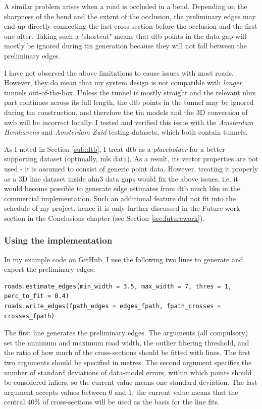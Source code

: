 A similar problem arises when a road is occluded in a bend. Depending on the sharpness of the bend and the extent of the occlusion, the preliminary edges may end up directly connecting the last cross-section before the occlusion and the first one after. Taking such a "shortcut" means that \ac{dtb} points in the data gap will mostly be ignored during \ac{tin} generation because they will not fall between the preliminary edges.

I have not observed the above limitations to cause issues with most roads. However, they do mean that my system design is not compatible with \textit{longer} tunnels out-of-the-box. Unless the tunnel is mostly straight and the relevant \ac{nbrs} part continues across its full length, the \ac{dtb} points in the tunnel may be ignored during \ac{tin} construction, and therefore the \ac{tin} models and the 3D conversion of \ac{nwb} will be incorrect locally. I tested and verified this issue with the \textit{Amsterdam Hemhavens} and \textit{Amsterdam Zuid} testing datasets, which both contain tunnels.

As I noted in Section \ref{sub:dtb}, I treat \ac{dtb} as a \textit{placeholder} for a better supporting dataset (optimally, \ac{mls} data). As a result, its vector properties are not used - it is assumed to consist of generic point data. However, treating it properly as a 3D line dataset inside \ac{ahn3} data gaps would fix the above issues, i.e. it would become possible to generate edge estimates from \ac{dtb} much like in the commercial implementation. Such an additional feature did not fit into the schedule of my project, hence it is only further discussed in the Future work section in the Conclusions chapter (see Section \ref{sec:futurework}).

\subsubsection{Using the implementation}

In my example code on GitHub, I use the following two lines to generate and export the preliminary edges:

\begin{verbatim}
roads.estimate_edges(min_width = 3.5, max_width = 7, thres = 1, perc_to_fit = 0.4)
roads.write_edges(fpath_edges = edges_fpath, fpath_crosses = crosses_fpath)
\end{verbatim}

The first line generates the preliminary edges. The arguments (all compulsory) set the minimum and maximum road width, the outlier filtering threshold, and the ratio of how much of the cross-sections should be fitted with lines. The first two arguments should be specified in metres. The second argument specifies the number of standard deviations of data-model errors, within which points should be considered inliers, so the current value means one standard deviation. The last argument accepts values between 0 and 1, the current value means that the central 40\% of cross-sections will be used as the basis for the line fits.

